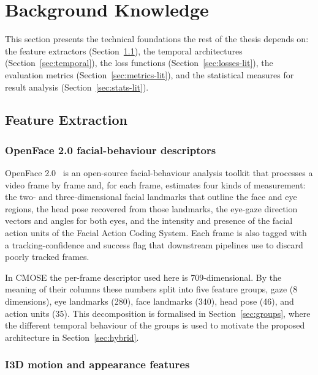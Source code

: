 \documentclass[../main.tex]{subfiles}
\begin{document}
\FloatBarrier
\section{Background Knowledge}
\label{sec:background-knowledge}

This section presents the technical foundations the rest of the thesis depends on: the feature extractors (Section~\ref{sec:feat}), the temporal architectures (Section~\ref{sec:temporal}), the loss functions (Section~\ref{sec:losses-lit}), the evaluation metrics (Section~\ref{sec:metrics-lit}), and the statistical measures for result analysis (Section~\ref{sec:stats-lit}).

\FloatBarrier
\subsection{Feature Extraction}
\label{sec:feat}

\subsubsection{OpenFace 2.0 facial-behaviour descriptors}

OpenFace 2.0~\cite{openface2} is an open-source facial-behaviour analysis toolkit that processes a video frame by frame and, for each frame, estimates four kinds of measurement: the two- and three-dimensional facial landmarks that outline the face and eye regions, the head pose recovered from those landmarks, the eye-gaze direction vectors and angles for both eyes, and the intensity and presence of the facial action units of the Facial Action Coding System. Each frame is also tagged with a tracking-confidence and success flag that downstream pipelines use to discard poorly tracked frames.

In CMOSE the per-frame descriptor used here is 709-dimensional. By the meaning of their columns these numbers split into five feature groups, gaze (8 dimensions), eye landmarks (280), face landmarks (340), head pose (46), and action units (35). This decomposition is formalised in Section~\ref{sec:groups}, where the different temporal behaviour of the groups is used to motivate the proposed architecture in Section~\ref{sec:hybrid}.

\subsubsection{I3D motion and appearance features}
\end{document}
